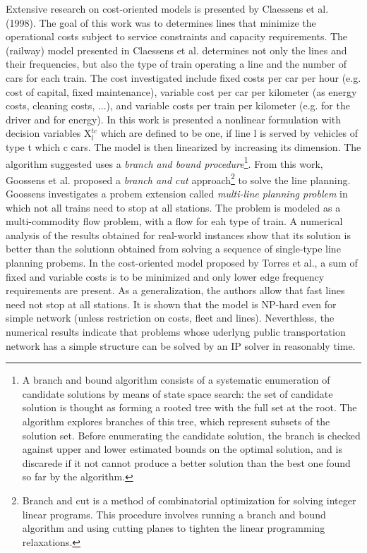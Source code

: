 \documentclass[
  twoside,
  11pt, a4paper,
  footinclude=true,
  headinclude=true,
  cleardoublepage=empty
]{scrbook}
\theoremstyle{definition}
\begin{document}
Extensive research on cost-oriented models is presented by Claessens et al. (1998). The goal of this work was to determines lines that minimize the operational costs subject to service constraints and capacity requirements. The (railway) model presented in Claessens et al. determines not only the lines and their frequencies, but also the type of train operating a line and the number of cars for each train. The cost investigated include fixed costs per car per hour (e.g. cost of capital, fixed maintenance), variable cost per car per kilometer (as energy costs, cleaning costs, ...), and variable costs per train per kilometer (e.g. for the driver and for energy). In this work is presented a nonlinear formulation with decision variables X$^{tc}_l$ which are defined to be one, if line l is served by vehicles of type t which c cars. The model is then linearized by increasing its dimension. The algorithm suggested uses a \emph{branch and bound procedure}\footnote{A branch and bound algorithm consists of  a systematic enumeration of candidate solutions by means of state space search: the set of candidate solution is thought as forming a rooted tree with the full set at the root. The algorithm explores branches of this tree, which represent subsets of the solution set. Before enumerating the candidate solution, the branch is checked against upper and lower estimated bounds on the optimal solution, and is discarede if it not cannot produce a better solution than the best one found so far by the algorithm.}. \newline
From this work, Goossens et al. proposed a \emph{branch and cut} approach\footnote{Branch and cut is a method of combinatorial optimization for solving integer linear programs. This procedure involves running a branch and bound algorithm and using cutting planes to tighten the linear programming relaxations.} to solve the line planning. Goossens investigates a probem extension called \emph{multi-line planning problem} in which not all trains need to stop at all stations. The problem is modeled as a multi-commodity flow problem, with a flow for eah type of train. A numerical analysis of the results obtained for real-world instances show that its solution is better than the solutionn obtained from solving a sequence of single-type line planning probems. \newline
In the cost-oriented model proposed by Torres et al., a sum of fixed and variable costs is to be minimized and only lower edge frequency requirements are present. As a generalization, the authors allow that fast lines need not stop at all stations. It is shown that the model is NP-hard even for simple network (unless restriction on costs, fleet and lines). Neverthless, the numerical results indicate that problems whose uderlyng public transportation network has a simple structure can be solved by an IP solver in reasonably time.
\end{document}
